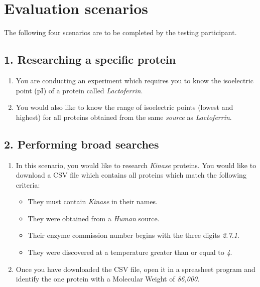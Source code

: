 \chapter{Evaluation scenarios}\label{app:evaluation-scenarios}

The following four scenarios are to be completed by the testing
participant.

\section*{1. Researching a specific protein}
\begin{enumerate}
\item You are conducting an experiment which requires you to know the
  isoelectric point (pI) of a protein called \textit{Lactoferrin}.
\item You would also like to know the range of isoelectric points
  (lowest and highest) for all proteins obtained from the same
  \textit{source} as \textit{Lactoferrin}.
\end{enumerate}

\section*{2. Performing broad searches}
\begin{enumerate}
\item In this scenario, you would like to research \textit{Kinase}
  proteins. You would like to download a CSV file which contains all
  proteins which match the following criteria:
  \begin{itemize}
  \item They must contain \textit{Kinase} in their names.
  \item They were obtained from a \textit{Human} source.
  \item Their enzyme commission number begins with the three digits
    \textit{2.7.1}.
  \item They were discovered at a temperature greater than or equal to \textit{4\celsius}.
  \end{itemize}
\item Once you have downloaded the CSV file, open it in a spreasheet
  program and identify the one protein with a Molecular Weight of
  \textit{86,000}.
\end{enumerate}

